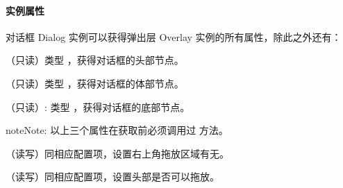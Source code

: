 \documentclass[letterpaper,10pt,english]{sphinxmanual}
\begin{document}
\paragraph{实例属性}
\label{api/component/overlay/dialog:id4}
对话框 Dialog 实例可以获得弹出层 Overlay 实例的所有属性，除此之外还有：


\begin{fulllineitems}
\label{api/component/overlay/dialog:Overlay.header}
（只读）类型  ，获得对话框的头部节点。

\end{fulllineitems}



\begin{fulllineitems}
\label{api/component/overlay/dialog:Overlay.body}
（只读）类型  ，获得对话框的体部节点。

\end{fulllineitems}



\begin{fulllineitems}
\label{api/component/overlay/dialog:Overlay.footer}
（只读）: 类型  ，获得对话框的底部节点。

\end{fulllineitems}


\begin{notice}{note}{Note:}
以上三个属性在获取前必须调用过  方法。
\end{notice}


\begin{fulllineitems}
（读写）同相应配置项，设置右上角拖放区域有无。

\end{fulllineitems}



\begin{fulllineitems}
（读写）同相应配置项，设置头部是否可以拖放。

\end{fulllineitems}
\end{document}
